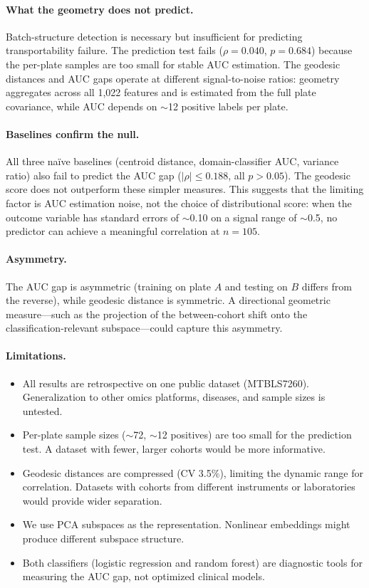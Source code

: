 \documentclass{article}
\begin{document}
\paragraph{What the geometry does not predict.} Batch-structure detection is necessary but insufficient for predicting transportability failure. The prediction test fails ($\rho = 0.040$, $p = 0.684$) because the per-plate samples are too small for stable AUC estimation. The geodesic distances and AUC gaps operate at different signal-to-noise ratios: geometry aggregates across all 1{,}022 features and is estimated from the full plate covariance, while AUC depends on $\sim$12 positive labels per plate.

\paragraph{Baselines confirm the null.} All three na\"{i}ve baselines (centroid distance, domain-classifier AUC, variance ratio) also fail to predict the AUC gap ($|\rho| \leq 0.188$, all $p > 0.05$). The geodesic score does not outperform these simpler measures. This suggests that the limiting factor is AUC estimation noise, not the choice of distributional score: when the outcome variable has standard errors of $\sim$0.10 on a signal range of $\sim$0.5, no predictor can achieve a meaningful correlation at $n = 105$.

\paragraph{Asymmetry.} The AUC gap is asymmetric (training on plate $A$ and testing on $B$ differs from the reverse), while geodesic distance is symmetric. A directional geometric measure---such as the projection of the between-cohort shift onto the classification-relevant subspace---could capture this asymmetry.

\paragraph{Limitations.}

\begin{itemize}
\item All results are retrospective on one public dataset (MTBLS7260). Generalization to other omics platforms, diseases, and sample sizes is untested.
\item Per-plate sample sizes ($\sim$72, $\sim$12 positives) are too small for the prediction test. A dataset with fewer, larger cohorts would be more informative.
\item Geodesic distances are compressed (CV 3.5\%), limiting the dynamic range for correlation. Datasets with cohorts from different instruments or laboratories would provide wider separation.
\item We use PCA subspaces as the representation. Nonlinear embeddings might produce different subspace structure.
\item Both classifiers (logistic regression and random forest) are diagnostic tools for measuring the AUC gap, not optimized clinical models.
\end{itemize}
\end{document}
